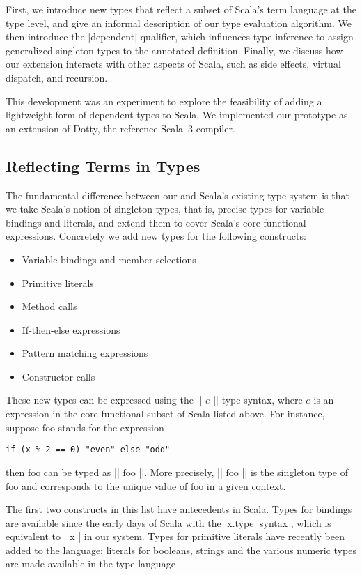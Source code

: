 First, we introduce new types that reflect a subset of Scala's term language at the type level, and give an informal description of our type evaluation algorithm.
We then introduce the |dependent| qualifier, which influences type inference to assign generalized singleton types to the annotated definition.
Finally, we discuss how our extension interacts with other aspects of Scala, such as side effects, virtual dispatch, and recursion.

This development was an experiment to explore the feasibility of adding a lightweight form of dependent types to Scala.
We implemented our prototype as an extension of Dotty, the reference Scala~3 compiler.

\subsection{Reflecting Terms in Types}

The fundamental difference between our and Scala's existing type system is that we take Scala's notion of singleton types, that is, precise types for variable bindings and literals, and extend them to cover Scala's core functional expressions.
Concretely we add new types for the following constructs:

\begin{itemize}
  \item Variable bindings and member selections
  \item Primitive literals
  \item Method calls
  \item If-then-else expressions
  \item Pattern matching expressions
  \item Constructor calls
\end{itemize}

These new types can be expressed using the |{| $e$ |}| type syntax, where $e$ is an expression in the core functional subset of Scala listed above.
For instance, suppose $\text{foo}$ stands for the expression

\begin{lstlisting}
if (x % 2 == 0) "even" else "odd"
\end{lstlisting}

\noindent then $\text{foo}$ can be typed as |{| $\text{foo}$ |}|.
More precisely, |{| $\text{foo}$ |}| is the singleton type of $\text{foo}$ and corresponds to the unique value of $\text{foo}$ in a given context.

The first two constructs in this list have antecedents in Scala.
Types for bindings are available since the early days of Scala with the |x.type| syntax \citep[Section 3.2.1]{odersky2006scala}, which is equivalent to |{ x }| in our system.
Types for primitive literals have recently been added to the language: literals for booleans, strings and the various numeric types are made available in the type language \citep{leontiev2014sip}.

